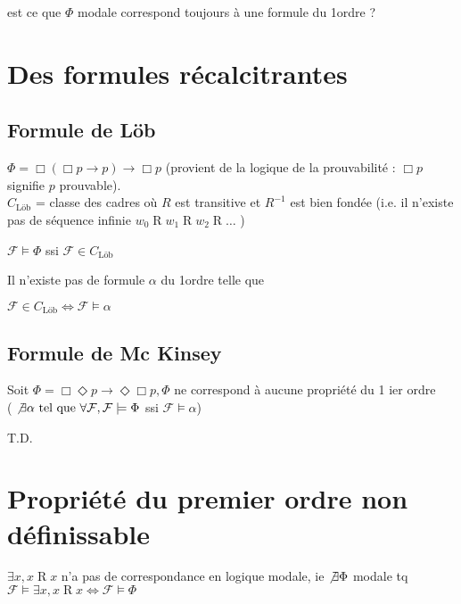 \documentclass[10pt,a4paper]{article}
\newcommand{\F}{\mathcal{F}}
\DeclareMathOperator{\Ro}{R}
\begin{document}
\begin{ques}
 est ce que $\Phi$ modale correspond toujours à une formule du 1\ier ordre ? 
\end{ques}

\section{Des formules récalcitrantes}

\subsection{Formule de Löb}
$\Phi = \Box ( \Box p \rightarrow p) \rightarrow \Box p$
(provient de la logique de la prouvabilité : $\Box p$ signifie $p$ prouvable).\\
$C_{\text{Löb}}$ = classe des cadres où $R$ est transitive et $R^{-1}$ est bien fondée (i.e. il n'existe pas de séquence infinie $w_0   \Ro w_1   \Ro w_2   \Ro \dots$ )

\begin{prop}
$ \F \models \Phi$ ssi $\F \in C_{\text{Löb}}$
\end{prop}
\begin{dem}
 
\end{dem}

\begin{prop}
 Il n'existe pas de formule $\alpha$ du 1\ier ordre telle que

$\F \in C_{\text{Löb}} \Leftrightarrow \F \models \alpha$
\end{prop}
\begin{dem}
 
\end{dem}

\subsection{Formule de Mc Kinsey}
\begin{prop}
 Soit $\Phi = \Box \Diamond p \rightarrow \Diamond \Box p, \Phi$ ne correspond à aucune propriété du 1 ier ordre \\( $\not \exists \alpha  \tq \forall \F, \F \models \Phi$ ssi $\F \models \alpha$)
\end{prop}

\begin{dem}
 T.D.
\end{dem}


\section{Propriété du premier ordre non définissable}
\begin{prop}
 $\exists x, x   \Ro x$ n'a pas de correspondance en logique modale, ie $\not \exists \Phi$ modale tq $\F \models \exists x, x   \Ro x \Leftrightarrow \F \models \Phi$
\end{prop}
\end{document}
